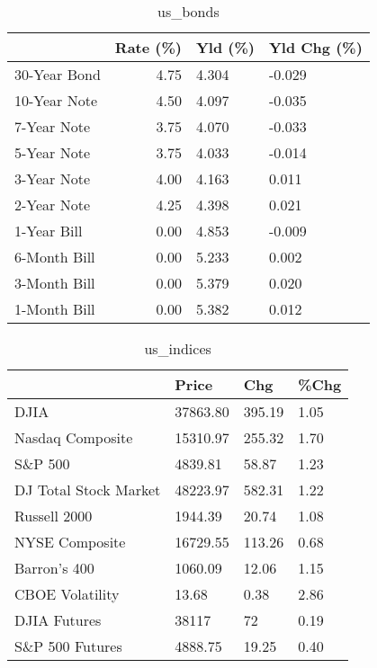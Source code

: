 \documentclass{article}%
\begin{document}
\begin{table}[htbp]%
\caption{us\_bonds}%
\centering%
\begin{adjustbox}{width=1\textwidth}%
\begin{tabular}{lrll}
\toprule
             &  Rate (\%) & Yld (\%) & Yld Chg (\%) \\
\midrule
30-Year Bond &      4.75 &   4.304 &      -0.029 \\
10-Year Note &      4.50 &   4.097 &      -0.035 \\
 7-Year Note &      3.75 &   4.070 &      -0.033 \\
 5-Year Note &      3.75 &   4.033 &      -0.014 \\
 3-Year Note &      4.00 &   4.163 &       0.011 \\
 2-Year Note &      4.25 &   4.398 &       0.021 \\
 1-Year Bill &      0.00 &   4.853 &      -0.009 \\
6-Month Bill &      0.00 &   5.233 &       0.002 \\
3-Month Bill &      0.00 &   5.379 &       0.020 \\
1-Month Bill &      0.00 &   5.382 &       0.012 \\
\bottomrule
\end{tabular}
%
\end{adjustbox}%
\end{table}

%


\begin{table}[htbp]%
\caption{us\_indices}%
\centering%
\begin{adjustbox}{width=1\textwidth}%
\begin{tabular}{llll}
\toprule
                      &    Price &    Chg & \%Chg \\
\midrule
                 DJIA & 37863.80 & 395.19 & 1.05 \\
     Nasdaq Composite & 15310.97 & 255.32 & 1.70 \\
              S\&P 500 &  4839.81 &  58.87 & 1.23 \\
DJ Total Stock Market & 48223.97 & 582.31 & 1.22 \\
         Russell 2000 &  1944.39 &  20.74 & 1.08 \\
       NYSE Composite & 16729.55 & 113.26 & 0.68 \\
         Barron's 400 &  1060.09 &  12.06 & 1.15 \\
      CBOE Volatility &    13.68 &   0.38 & 2.86 \\
         DJIA Futures &    38117 &     72 & 0.19 \\
      S\&P 500 Futures &  4888.75 &  19.25 & 0.40 \\
\bottomrule
\end{tabular}
%
\end{adjustbox}%
\end{table}
\end{document}
